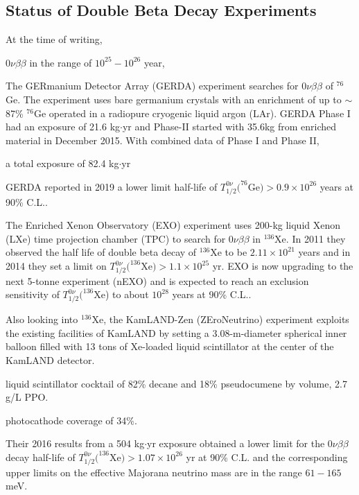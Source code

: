 \subsection{Status of Double Beta Decay Experiments}

At the time of writing, 

$0\nu\beta\beta$ in the range of $10^{25}-10^{26}$ year,




The GERmanium Detector Array (GERDA) experiment searches for $0\nu\beta\beta$ of $^{76}$Ge. The experiment uses bare germanium crystals with an enrichment of up to $\sim$87\% $^{76}$Ge operated in a radiopure cryogenic liquid argon (LAr). GERDA Phase I had an exposure of 21.6 kg$\cdot$yr and Phase-II started with 35.6kg from enriched material in December 2015. With combined data of Phase I and Phase II, 

a total exposure of 82.4 kg$\cdot$yr 



GERDA reported in 2019 a lower limit half-life of $T^{0\nu}_{1/2}(^{76}$Ge$)>0.9\times 10^{26}$ years at 90\% C.L.\cite{gerda,agostini2019probing}.




The Enriched Xenon Observatory (EXO) experiment uses 200-kg liquid Xenon (LXe) time projection chamber (TPC) to search for $0\nu\beta\beta$ in $^{136}$Xe. In 2011 they observed the half life of double beta decay of $^{136}$Xe to be $2.11\times 10^{21}$ years and in 2014 they set a limit on $T^{0\nu}_{1/2}(^{136}$Xe$)>1.1\times 10^{25}$ yr\cite{exo}. EXO is now upgrading to the next 5-tonne experiment (nEXO) and is expected to reach an exclusion sensitivity of $T^{0\nu}_{1/2}(^{136}$Xe) to about $10^{28}$ years at 90\% C.L.\cite{nEXO}.

Also looking into $^{136}$Xe, the KamLAND-Zen (ZEroNeutrino) experiment exploits the existing facilities of KamLAND by setting a 3.08-m-diameter spherical inner balloon filled with 13 tons of Xe-loaded liquid scintillator at the center of the KamLAND detector.

liquid scintillator cocktail of 82\% decane and 18\% pseudocumene by volume, 2.7 g/L PPO.

photocathode coverage of 34\%.

 Their 2016 results from a 504 kg$\cdot$yr exposure obtained a lower limit for the $0\nu\beta\beta$ decay half-life of $T^{0\nu}_{1/2}(^{136}$Xe$)>1.07\times 10^{26}$ yr at 90\% C.L. and the corresponding upper limits on the effective Majorana neutrino mass are in the range $61-165$ meV\cite{kamlandZen}.

